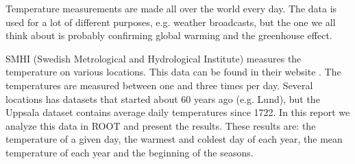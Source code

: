

Temperature measurements are made all over the world every day. The data is used for a lot of different purposes, e.g. weather broadcasts, but the one we all think about is probably confirming global warming and the greenhouse effect. 

SMHI (Swedish Metrological and Hydrological Institute) measures the temperature on various locations. This data can be found in their website \cite{smhidata}. The temperatures are measured between one and three times per day. Several locations has datasets that started about 60 years ago (e.g. Lund), but the Uppsala dataset contains average daily temperatures since 1722. In this report we analyze this data in ROOT and present the results. These results are: the temperature of a given day, the warmest and coldest day of each year, the mean temperature of each year and the beginning of the seasons. 


